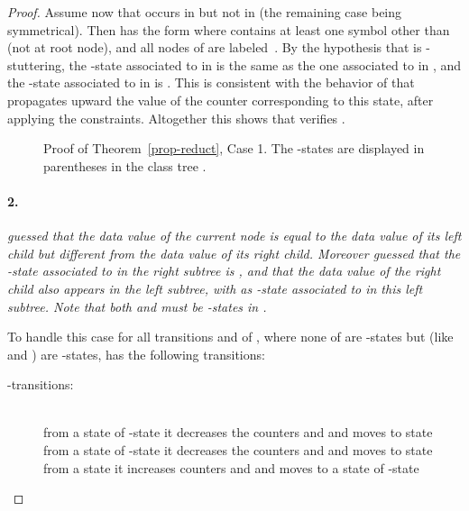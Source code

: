 \documentclass{CSML}
\begin{document}
\begin{proof}
Assume now that  occurs in  but not in  (the remaining
case being symmetrical). Then  has the form  
where  contains at least one symbol other than  (not at root node),
and all nodes of  are labeled~.
By the hypothesis that  is -stuttering, 
the -state associated to  in  is the same as the one
associated to  in ,
and the -state associated to  in  is .
This is consistent with the behavior of 
that propagates upward the value of the counter corresponding to this state, 
after applying the constraints.
Altogether this shows that  verifies .


\begin{figure}
\small

\caption{Proof of Theorem~\ref{prop-reduct}, Case 1.
The -states are displayed in parentheses in the class tree .}
\label{fig-reduct1}
\end{figure}







\paragraph{\bf 2.}  \emph{ guessed that the data value  of
  the current node is equal to the data value of its left child but different
  from the data value  of its right child. 
  Moreover  guessed that the -state associated to  in the right
  subtree is , and that the data value  of the right child also appears in the left subtree, with  as -state associated to  in this left subtree.
  Note that both  and  must be -states in .}

\noindent
To handle this case for all transitions 
and  of
, where none of  are -states but
 (like  and ) are -states, 
 has the following transitions:
\begin{description}
\item[\rm -transitions:] \quad\\
from a state  of -state 
it decreases the counters  and  
and moves to state \\
from a state  of -state  
it decreases the counters  and  
and moves to state \\
from a state  
it increases counters  and  
and moves to a state  of -state 


\end{description}
\end{proof}
\end{document}
